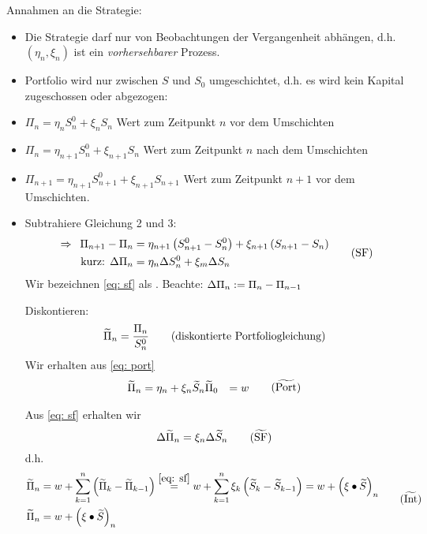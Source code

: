 Annahmen an die Strategie:
\begin{itemize}
	\item Die Strategie darf nur von Beobachtungen der Vergangenheit abhängen, d.h. $(\eta_n, \xi_n)$ ist ein \textit{vorhersehbarer} Prozess.
	\item Portfolio wird nur zwischen $S$ und $S_0$ umgeschichtet, d.h. es wird kein Kapital zugeschossen oder abgezogen:
	
	\item $\Pi_n = \eta_n S_n^0 + \xi_n S_n$ Wert zum Zeitpunkt $n$ vor dem Umschichten
	\item $\Pi_n = \eta_{n+1} S_n^0 + \xi_{n+1}S_n$ Wert zum Zeitpunkt $n$ nach dem Umschichten
	\item $\Pi_{n+1} = \eta_{n+1} S_{n+1}^0 + \xi_{n+1} S_{n+1}$ Wert zum Zeitpunkt $n+1$ vor dem Umschichten.
	
	\item Subtrahiere Gleichung 2 und 3: 
	\begin{equation}
		\begin{aligned}
			\enskip \Rightarrow \enskip \Pi_{n+1} - \Pi_n &= \eta_{n+1} \left( S_{n+1}^0 - S_n^0 \right) + \xi_{n+1} \left( S_{n+1} - S_n \right) \\
			\text{kurz: } \Delta \Pi_n &= \eta_n \Delta S_n^0 + \xi_m \Delta S_n
		\end{aligned}
		\tag{SF} \label{eq: sf}
	\end{equation}
	Wir bezeichnen \eqref{eq: sf} als . Beachte: $\Delta \Pi_n \mathrel{:=} \Pi_n - \Pi_{n-1}$
	
	Diskontieren:
	\begin{equation}
		\widetilde{\Pi}_n = \frac{\Pi_n}{S_n^0} 
		\tag{diskontierte Portfoliogleichung}
	\end{equation}
	Wir erhalten aus \eqref{eq: port}
	\begin{equation}
		\begin{aligned}
		\schlange{\Pi}_n &= \eta_n + \xi_n \schlange{S}_n
		\schlange{\Pi}_0 &= w
		\end{aligned}
		\tag{$\schlange{\text{Port}}$}
	\end{equation}
	
	Aus \eqref{eq: sf} erhalten wir
	\begin{equation}
		\Delta \schlange{\Pi}_n = \xi_n \Delta \schlange{S}_n
		\tag{$\schlange{\text{SF}}$}
	\end{equation}
	d.h.
	\begin{equation}
		\begin{aligned}
			\schlange{\Pi}_n  &= w + \sum_{k=1}^n \brackets{\schlange\Pi_k - \schlange\Pi_{k-1} }
			\overset{\eqref{eq: sf}}{=} w + \sum_{k=1}^n \xi_k \brackets{\schlange S_k - \schlange S_{k-1}} 
			= w + \brackets{\xi \bullet \schlange{S}}_n \\
			\schlange\Pi_n &= w + \brackets{\xi \bullet \schlange{S}}_n
		\end{aligned}
		\tag{$\schlange{\text{Int}}$}
	\end{equation}
\end{itemize}

